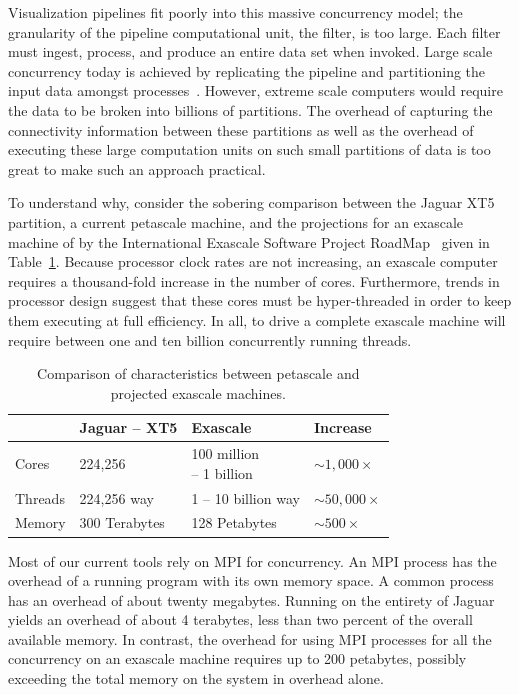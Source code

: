 \documentclass{vgtc}                          %
\newcommand*{\lcite}[1]{~\cite{#1}}
\begin{document}
Visualization pipelines fit poorly into this massive concurrency model; the
granularity of the pipeline computational unit, the filter, is too large.
Each filter must ingest, process, and produce an entire data set when
invoked.  Large scale concurrency today is achieved by replicating the
pipeline and partitioning the input data amongst processes\lcite{Ahrens00}.
However, extreme scale computers would require the data to be broken into
billions of partitions.  The overhead of capturing the connectivity
information between these partitions as well as the overhead of executing
these large computation units on such small partitions of data is too great
to make such an approach practical.

To understand why, consider the sobering comparison between the
Jaguar XT5 partition, a current petascale machine, and the projections for
an exascale machine of by the International Exascale Software Project
RoadMap\lcite{ExascaleRoadMap} given in Table~\ref{table:PetaExaCompare}.
Because processor clock rates are not increasing, an exascale computer
requires a thousand-fold increase in the number of cores.  Furthermore,
trends in processor design suggest that these cores must be hyper-threaded
in order to keep them executing at full efficiency.  In all, to drive a
complete exascale machine will require between one and ten billion
concurrently running threads.

\begin{table}[htbp]
  \centering
  \caption{Comparison of characteristics between petascale and projected
    exascale machines.}
  \label{table:PetaExaCompare}
  \vspace{6pt}
  \begin{tabular}{llll}
    & Jaguar -- XT5 & Exascale & Increase \\
    \hline
    Cores & 224,256 & \parbox{.7in}{\vspace*{2pt}100 million\\ \hspace*{6pt} -- 1 billion\vspace*{2pt}} & $\sim{}1,000\times$ \\
    Threads & 224,256 way & 1 -- 10 billion way & $\sim{}50,000\times$ \\
    Memory & 300 Terabytes & 128 Petabytes & $\sim{}500\times$
  \end{tabular}
\end{table}

Most of our current tools rely on MPI for concurrency.  An MPI process has
the overhead of a running program with its own memory space.  A common
process has an overhead of about twenty megabytes.  Running on the entirety
of Jaguar yields an overhead of about 4 terabytes, less than two percent of
the overall available memory.  In contrast, the overhead for using MPI
processes for all the concurrency on an exascale machine requires up to 200
petabytes, possibly exceeding the total memory on the system in overhead
alone.
\end{document}
